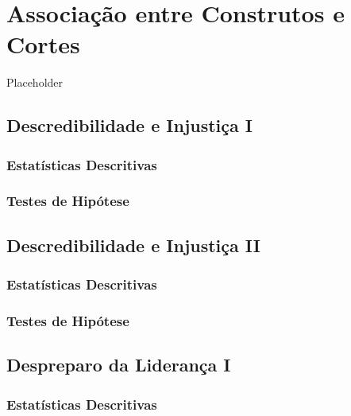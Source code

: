 \documentclass[]{book}
\begin{document}
\hypertarget{associacao-entre-construtos-e-cortes}{%
\chapter{Associação entre Construtos e Cortes}\label{associacao-entre-construtos-e-cortes}}

Placeholder

\hypertarget{descredibilidade-e-injustica-i}{%
\section{Descredibilidade e Injustiça I}\label{descredibilidade-e-injustica-i}}

\hypertarget{estatisticas-descritivas}{%
\subsection{Estatísticas Descritivas}\label{estatisticas-descritivas}}

\hypertarget{testes-de-hipotese}{%
\subsection{Testes de Hipótese}\label{testes-de-hipotese}}

\hypertarget{descredibilidade-e-injustica-ii}{%
\section{Descredibilidade e Injustiça II}\label{descredibilidade-e-injustica-ii}}

\hypertarget{estatisticas-descritivas-1}{%
\subsection{Estatísticas Descritivas}\label{estatisticas-descritivas-1}}

\hypertarget{testes-de-hipotese-1}{%
\subsection{Testes de Hipótese}\label{testes-de-hipotese-1}}

\hypertarget{despreparo-da-lideranca-i}{%
\section{Despreparo da Liderança I}\label{despreparo-da-lideranca-i}}

\hypertarget{estatisticas-descritivas-2}{%
\subsection{Estatísticas Descritivas}\label{estatisticas-descritivas-2}}
\end{document}
